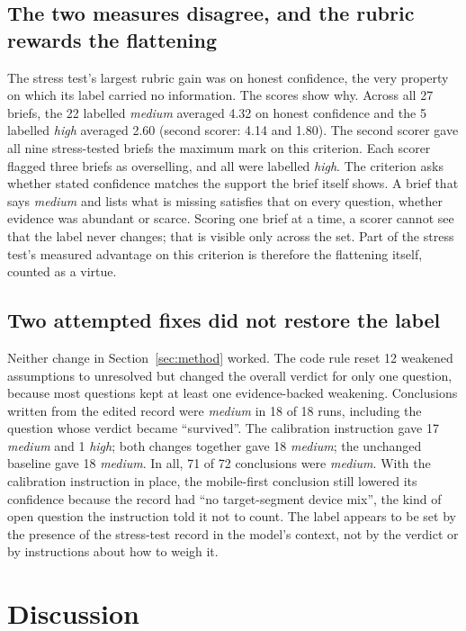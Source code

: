 \documentclass[11pt]{article}
\begin{document}
\subsection{The two measures disagree, and the rubric rewards the flattening}

The stress test's largest rubric gain was on honest confidence, the very property on which its label carried no information. The scores show why. Across all 27 briefs, the 22 labelled \emph{medium} averaged 4.32 on honest confidence and the 5 labelled \emph{high} averaged 2.60 (second scorer: 4.14 and 1.80). The second scorer gave all nine stress-tested briefs the maximum mark on this criterion. Each scorer flagged three briefs as overselling, and all were labelled \emph{high}. The criterion asks whether stated confidence matches the support the brief itself shows. A brief that says \emph{medium} and lists what is missing satisfies that on every question, whether evidence was abundant or scarce. Scoring one brief at a time, a scorer cannot see that the label never changes; that is visible only across the set. Part of the stress test's measured advantage on this criterion is therefore the flattening itself, counted as a virtue.

\subsection{Two attempted fixes did not restore the label}

Neither change in Section~\ref{sec:method} worked. The code rule reset 12 weakened assumptions to unresolved but changed the overall verdict for only one question, because most questions kept at least one evidence-backed weakening. Conclusions written from the edited record were \emph{medium} in 18 of 18 runs, including the question whose verdict became ``survived''. The calibration instruction gave 17 \emph{medium} and 1 \emph{high}; both changes together gave 18 \emph{medium}; the unchanged baseline gave 18 \emph{medium}. In all, 71 of 72 conclusions were \emph{medium}. With the calibration instruction in place, the mobile-first conclusion still lowered its confidence because the record had ``no target-segment device mix'', the kind of open question the instruction told it not to count. The label appears to be set by the presence of the stress-test record in the model's context, not by the verdict or by instructions about how to weigh it.

\section{Discussion}
\end{document}
